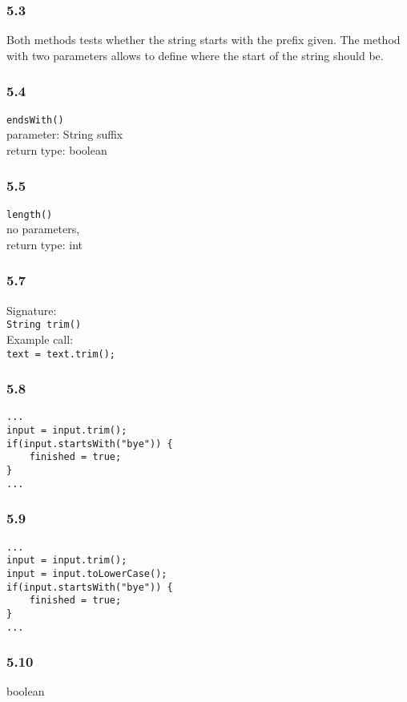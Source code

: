 \subsubsection{5.3}
Both methods tests whether the string starts with the prefix given. The method 
with two parameters allows to define where the start of the string should be. 

\subsubsection{5.4}
\verb!endsWith()! \\
parameter: String suffix \\
return type: boolean

\subsubsection{5.5}
\verb!length()! \\
no parameters, \\
return type: int

\subsubsection{5.7}
Signature: \\
\verb!String trim()! \\
Example call: \\
\verb!text = text.trim();!

\subsubsection{5.8}
\begin{lstlisting}
...
input = input.trim();
if(input.startsWith("bye")) {
    finished = true;
}
...
\end{lstlisting}

\subsubsection{5.9}
\begin{lstlisting}
...
input = input.trim();
input = input.toLowerCase();
if(input.startsWith("bye")) {
    finished = true;
}
...
\end{lstlisting}

\subsubsection{5.10}
boolean

